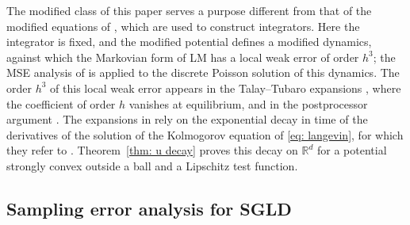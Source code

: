 \documentclass{article}
\numberwithin{equation}{section}
\begin{document}
The modified class of this paper serves a purpose different from that of the modified equations of \citep{abdulle2014high}, which are used to construct integrators. Here the integrator is fixed, and the modified potential defines a modified dynamics, against which the Markovian form of LM has a local weak error of order $h^3$; the MSE analysis of \citep{lu2025mse, ye2026mse} is applied to the discrete Poisson solution of this dynamics. The order $h^3$ of this local weak error appears in the Talay--Tubaro expansions \citep{leimkuhler2014long, leimkuhler2015computation}, where the coefficient of order $h$ vanishes at equilibrium, and in the postprocessor argument \citep{vilmart2015postprocessed}. The expansions in \citep{leimkuhler2014long} rely on the exponential decay in time of the derivatives of the solution of the Kolmogorov equation of \eqref{eq: langevin}, for which they refer to \citep{talay1990second}. Theorem~\ref{thm: u decay} proves this decay on $\mathbb R^d$ for a potential strongly convex outside a ball and a Lipschitz test function.

\subsection{Sampling error analysis for SGLD}
\label{subsec: related sgld}
\end{document}
